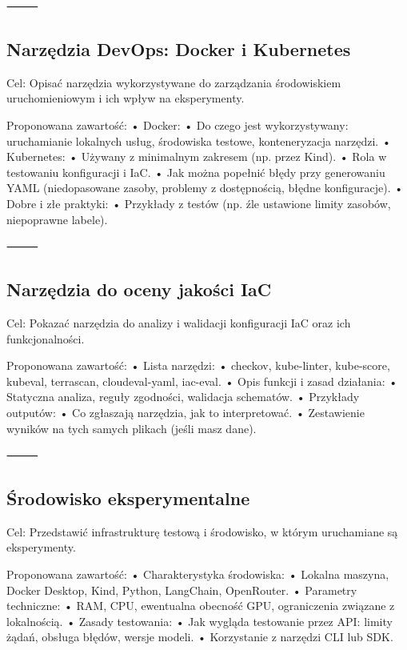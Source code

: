 ⸻

\subsection{Narzędzia DevOps: Docker i Kubernetes}

Cel: Opisać narzędzia wykorzystywane do zarządzania środowiskiem uruchomieniowym i ich wpływ na eksperymenty.

Proponowana zawartość:
	•	Docker:
	•	    Do czego jest wykorzystywany: uruchamianie lokalnych usług, środowiska testowe, konteneryzacja narzędzi.
	•	Kubernetes:
	•	    Używany z minimalnym zakresem (np. przez Kind).
	•	    Rola w testowaniu konfiguracji i IaC.
	•	    Jak można popełnić błędy przy generowaniu YAML (niedopasowane zasoby, problemy z dostępnością, błędne konfiguracje).
	•	Dobre i złe praktyki:
	•	    Przykłady z testów (np. źle ustawione limity zasobów, niepoprawne labele).

⸻

\subsection{Narzędzia do oceny jakości IaC}

Cel: Pokazać narzędzia do analizy i walidacji konfiguracji IaC oraz ich funkcjonalności.

Proponowana zawartość:
	•	Lista narzędzi:
	•	    checkov, kube-linter, kube-score, kubeval, terrascan, cloudeval-yaml, iac-eval.
	•	Opis funkcji i zasad działania:
	•	    Statyczna analiza, reguły zgodności, walidacja schematów.
	•	Przykłady outputów:
	•	    Co zgłaszają narzędzia, jak to interpretować.
	•	    Zestawienie wyników na tych samych plikach (jeśli masz dane).

⸻

\subsection{Środowisko eksperymentalne}

Cel: Przedstawić infrastrukturę testową i środowisko, w którym uruchamiane są eksperymenty.

Proponowana zawartość:
	•	Charakterystyka środowiska:
	•	    Lokalna maszyna, Docker Desktop, Kind, Python, LangChain, OpenRouter.
	•	Parametry techniczne:
	•	    RAM, CPU, ewentualna obecność GPU, ograniczenia związane z lokalnością.
	•	Zasady testowania:
	•	    Jak wygląda testowanie przez API: limity żądań, obsługa błędów, wersje modeli.
	•	    Korzystanie z narzędzi CLI lub SDK.

